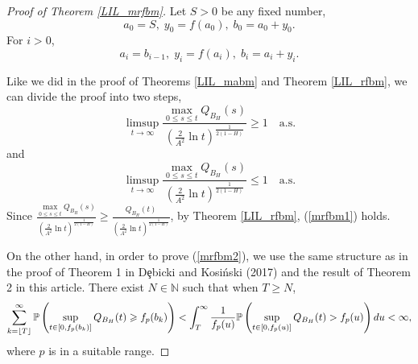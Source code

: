 \documentclass[main.tex]{subfiles}
\begin{document}
\begin{proof}[Proof of Theorem \ref{LIL_mrfbm}]
Let $S>0$ be any fixed number, 
$$a_0 = S,\;y_0 = f(a_0),\;b_0 = a_0+y_0.$$
For $i>0$,
$$a_i = b_{i-1},\;y_i = f(a_i),\;b_i = a_i+y_i.$$

Like we did in the proof of Theorems \ref{LIL_mabm} and Theorem \ref{LIL_rfbm}, we can divide the proof into two steps,
\begin{equation}
\label{mrfbm1}
	\limsup\limits_{t\to\infty}\frac{\max\limits_{0\leqslant s\leqslant t}Q_{B_H}(s)}{(\frac{2}{A^2}\ln t)^\frac{1}{2(1-H)}}\geqslant 1\quad\mathrm{a.s.}
\end{equation}
and
\begin{equation}
\label{mrfbm2}
	\limsup\limits_{t\to\infty}\frac{\max\limits_{0\leqslant s\leqslant t}Q_{B_H}(s)}{(\frac{2}{A^2}\ln t)^\frac{1}{2(1-H)}}\leqslant 1\quad\mathrm{a.s.}
\end{equation}
Since $\frac{\max\limits_{0\leqslant s\leqslant t}Q_{B_H}(s)}{(\frac{2}{A^2}\ln t)^\frac{1}{2(1-H)}}\geqslant\frac{Q_{B_H}(t)}{(\frac{2}{A^2}\ln t)^\frac{1}{2(1-H)}}$, by Theorem \ref{LIL_rfbm}, (\ref{mrfbm1}) holds.

On the other hand, in order to prove (\ref{mrfbm2}), we use the same structure as in the proof of Theorem 1 in D{\c e}bicki and Kosi{\'n}ski (2017) and the result of Theorem 2 in this article. There exist $N\in\mathbb{N}$ such that when $T\geqslant N$,
$$\sum^{\infty}_{k=\floor*{T}}\mathbb{P}\left(\sup\limits_{t\in[0,f_p(b_k)]}Q_{B_H}(t)\geqslant f_p(b_k)\right)<\int_T^\infty\frac{1}{f_p(u)}\mathbb{P}\left(\sup\limits_{t\in[0,f_p(u)]}Q_{B_{H}}(t)>f_p(u)\right)du<\infty,$$
where $p$ is in a suitable range.


\end{proof}
\end{document}
